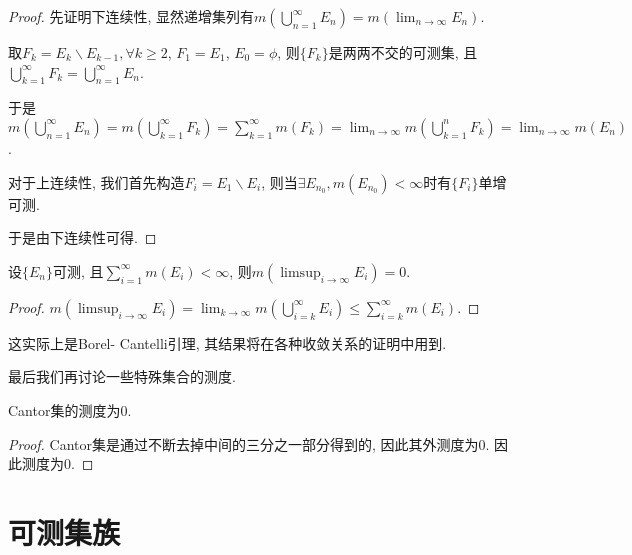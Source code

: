 \documentclass[theorem=false,mathfont=none,openany,sub3section]{easybook}
\begin{document}
\begin{proof}
  先证明下连续性, 显然递增集列有$m(\bigcup_{n=1}^{\infty}E_n)=m(\lim_{n \to \infty}E_n)$.\par
  取$F_k=E_k \backslash E_{k-1}, \forall k \geqslant 2$, $F_1=E_1$, $E_0=\phi$, 则$\{F_k\}$是两两不交的可测集, 且$\bigcup_{k=1}^{\infty}F_k=\bigcup_{n=1}^{\infty}E_n$.\par
  于是$m(\bigcup_{n=1}^{\infty}E_n)=m(\bigcup_{k=1}^{\infty}F_k) = \sum_{k=1}^{\infty}m(F_k)=\lim_{n \to \infty} m(\bigcup_{k=1}^{n}F_k)=\lim_{n \to \infty}m(E_n)$.\par
  对于上连续性, 我们首先构造$F_{i}=E_1\backslash E_{i}$, 则当$\exists E_{n_0}, m(E_{n_0})<\infty$时有$\{F_i\}$单增可测.\par
  于是由下连续性可得.\par
\end{proof}

\begin{corollary}
  设$\{E_n\}$可测, 且$\sum_{i=1}^{\infty}m(E_i)<\infty$, 则$m(\limsup_{i \to \infty} E_i)=0$.\par
\end{corollary}

\begin{proof}
  $m(\limsup_{i \to \infty} E_i)=\lim_{k \to \infty} m(\bigcup_{i=k}^{\infty}E_i)\leqslant \sum_{i=k}^{\infty}m(E_i)$.\par
\end{proof}

\begin{remark}
  这实际上是Borel- Cantelli引理, 其结果将在各种收敛关系的证明中用到.\par
\end{remark}

最后我们再讨论一些特殊集合的测度.\par

\begin{proposition}
  Cantor集的测度为0.\par
\end{proposition}

\begin{proof}
  Cantor集是通过不断去掉中间的三分之一部分得到的, 因此其外测度为0. 因此测度为0.\par
\end{proof}

\newpage

\section{可测集族}
\end{document}
